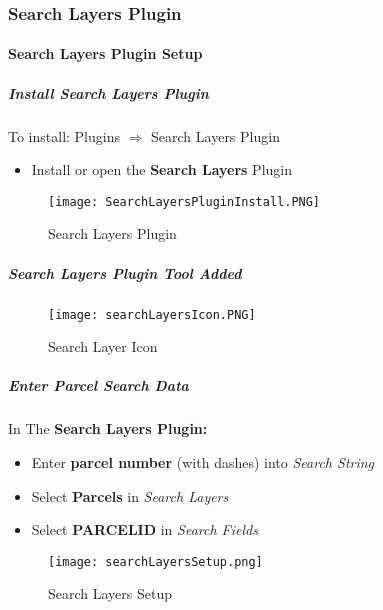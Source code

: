 \subsubsection{Search Layers Plugin}
\paragraph{Search Layers Plugin Setup}
\subparagraph{Install Search Layers Plugin}
\vspace{.2in}
 
\noindent To install: Plugins $\Rightarrow$ Search Layers Plugin
\vspace{.2in}

\begin{itemize}
\item Install or open the \textbf{Search Layers} Plugin
\end{itemize}
\begin{figure}[H]
\centering
     \texttt{[image: SearchLayersPluginInstall.PNG]}

\caption{Search Layers Plugin}
\end{figure}

\subparagraph{Search Layers Plugin Tool Added}
\begin{figure}[H]
\centering
     \texttt{[image: searchLayersIcon.PNG]}

\caption{Search Layer Icon}
\end{figure}

\clearpage  


\subparagraph*{Enter Parcel Search Data}
\vspace{.2in}

\noindent In The \textbf{Search Layers Plugin:}
\vspace{.15in}

\begin{itemize}
\item Enter \textbf{parcel number} {\tiny (with dashes)} into \emph{Search String}
\item Select \textbf{Parcels} in \emph{Search Layers}
\item Select \textbf{PARCELID} in \emph{Search Fields}
\end{itemize}
\begin{figure}[H]
\centering
    \texttt{[image: searchLayersSetup.png]}
\vspace{-.1in}

\caption{Search Layers Setup}
\end{figure}

